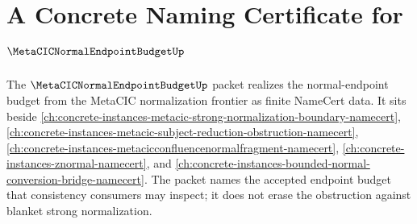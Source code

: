 \chapter{A Concrete Naming Certificate for $\MetaCICNormalEndpointBudgetUp$}
\label{ch:concrete-instances-metacic-normal-endpoint-budget-namecert}

The $\MetaCICNormalEndpointBudgetUp$ packet realizes the normal-endpoint budget from the MetaCIC normalization frontier as finite NameCert data. It sits beside \autoref{ch:concrete-instances-metacic-strong-normalization-boundary-namecert}, \autoref{ch:concrete-instances-metacic-subject-reduction-obstruction-namecert}, \autoref{ch:concrete-instances-metacicconfluencenormalfragment-namecert}, \autoref{ch:concrete-instances-znormal-namecert}, and \autoref{ch:concrete-instances-bounded-normal-conversion-bridge-namecert}. The packet names the accepted endpoint budget that consistency consumers may inspect; it does not erase the obstruction against blanket strong normalization.

